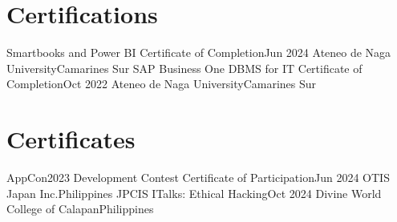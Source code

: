 \section{Certifications}

\resumeSubHeadingListStart
    \resumeSubheading
    {Smartbooks and Power BI Certificate of Completion}{Jun 2024}
    {Ateneo de Naga University}{Camarines Sur}
    \resumeSubheading
    {SAP Business One DBMS for IT Certificate of Completion}{Oct 2022}
    {Ateneo de Naga University}{Camarines Sur}
\resumeSubHeadingListEnd

\section{Certificates}

\resumeSubHeadingListStart
    \resumeSubheading
    {AppCon2023 Development Contest Certificate of Participation}{Jun 2024}
    {OTIS Japan Inc.}{Philippines}
    \resumeSubheading
    {JPCIS ITalks: Ethical Hacking}{Oct 2024}
    {Divine World College of Calapan}{Philippines}
\resumeSubHeadingListEnd